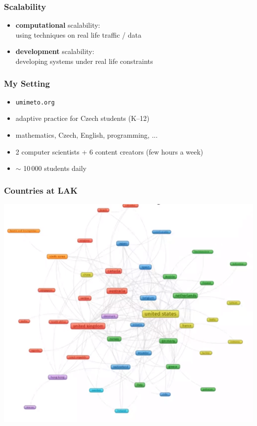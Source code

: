 \documentclass[bigger]{beamer}
\begin{document}
\begin{frame}
  \frametitle{Scalability}

  \begin{itemize}
  \item \textbf{computational} scalability: \\
    using techniques on real life traffic / data
  \item \textbf{development} scalability:\\
    developing systems under real life constraints
  \end{itemize}
\end{frame}

\begin{frame}
  \frametitle{My Setting}

  \begin{itemize}
  \item \texttt{umimeto.org}
  \item adaptive practice for Czech students (K--12)
  \item mathematics, Czech, English, programming, ...
  \item 2 computer scientists + 6 content creators (few hours a week)
  \item $\sim$ 10\,000 students daily
  \end{itemize}
\end{frame}

\begin{frame}
  \frametitle{Countries at LAK}

  \begin{center}
    \includegraphics[width=.7\linewidth]{lak-countries}
  \end{center}
\end{frame}
\end{document}
